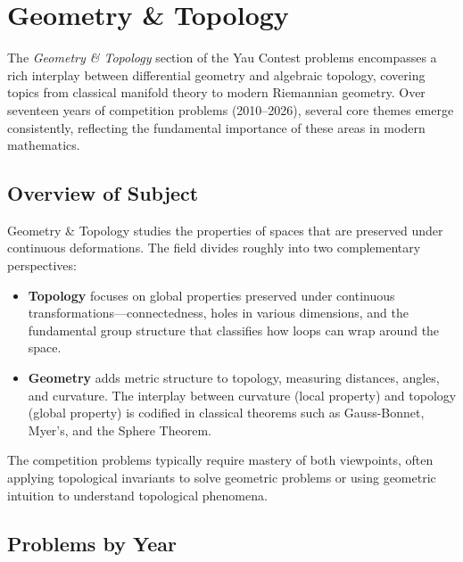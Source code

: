 \section{Geometry \& Topology}
\label{sec:geometry}

The \textit{Geometry \& Topology} section of the Yau Contest problems encompasses a rich interplay between
differential geometry and algebraic topology, covering topics from classical manifold theory to modern
Riemannian geometry. Over seventeen years of competition problems (2010--2026), several core themes emerge
consistently, reflecting the fundamental importance of these areas in modern mathematics.

\subsection{Overview of Subject}

Geometry \& Topology studies the properties of spaces that are preserved under continuous deformations.
The field divides roughly into two complementary perspectives:
\begin{itemize}
    \item \textbf{Topology} focuses on global properties preserved under continuous transformations---connectedness,
          holes in various dimensions, and the fundamental group structure that classifies how loops can wrap
          around the space.
    \item \textbf{Geometry} adds metric structure to topology, measuring distances, angles, and curvature.
          The interplay between curvature (local property) and topology (global property) is codified in
          classical theorems such as Gauss-Bonnet, Myer's, and the Sphere Theorem.
\end{itemize}

The competition problems typically require mastery of both viewpoints, often applying topological invariants
to solve geometric problems or using geometric intuition to understand topological phenomena.

\subsection{Problems by Year}

